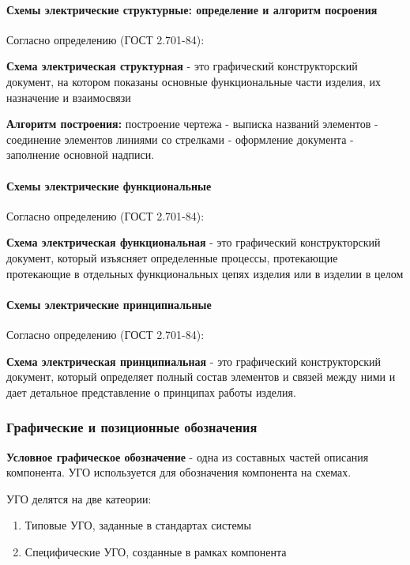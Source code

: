 \documentclass{article}
\begin{document}
\begin{flushleft}
\paragraph{Схемы электрические структурные: определение и алгоритм посроения}

Согласно определению (ГОСТ 2.701-84):

\textbf{Схема электрическая структурная} - это графический конструкторский документ, на котором показаны основные функциональные части изделия, их назначение и взаимосвязи

\textbf{Алгоритм построения:} построение чертежа - выписка названий элементов - соединение элементов линиями со стрелками - оформление документа - заполнение основной надписи.

\paragraph{Схемы электрические функциональные}

Согласно определению (ГОСТ 2.701-84):

\textbf{Схема электрическая функциональная} - это графический конструкторский документ, который изъясняет определенные процессы, протекающие протекающие в отдельных функциональных цепях изделия или в изделии в целом

\paragraph{Схемы электрические принципиальные}

Согласно определению (ГОСТ 2.701-84):

\textbf{Схема электрическая принципиальная} - это графический конструкторский документ, который определяет полный состав элементов и связей между ними и дает детальное представление о принципах работы изделия.

\subsubsection{Графические и позиционные обозначения}

\textbf{Условное графическое обозначение} - одна из составных частей описания компонента. УГО используется для обозначения компонента на схемах.

УГО делятся на две катеории:

\begin{enumerate}
    \item Типовые УГО, заданные в стандартах системы
    \item Специфические УГО, созданные в рамках компонента
\end{enumerate}


\end{flushleft}
\end{document}
